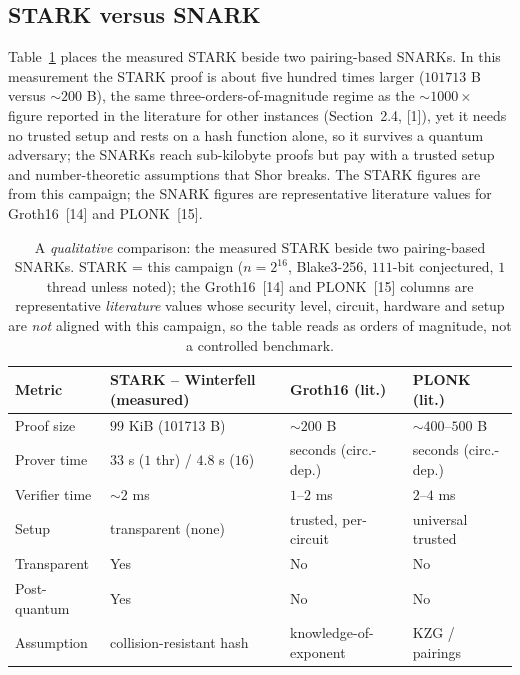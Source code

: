 \documentclass[11pt]{article}
\begin{document}
\subsection{STARK versus SNARK}
\label{sec:starkvssnark}

Table~\ref{tab:t5} places the measured STARK beside two pairing-based SNARKs. In this measurement the
STARK proof is about five hundred times larger ($\num{101713}$ B versus ${\sim}200$ B), the same
three-orders-of-magnitude regime as the ${\sim}1000\times$ figure reported in the literature for other
instances (Section~2.4, [1]), yet it needs no trusted setup and rests on a hash function alone, so
it survives a quantum adversary; the SNARKs reach sub-kilobyte proofs but pay with a trusted setup and
number-theoretic assumptions that Shor breaks. The STARK figures are from this campaign; the SNARK
figures are representative literature values for Groth16~[14] and PLONK~[15].

\begin{table}[htbp]\centering\footnotesize
\caption{A \emph{qualitative} comparison: the measured STARK beside two pairing-based SNARKs. STARK = this
campaign ($n=2^{16}$, Blake3-256, $111$-bit conjectured, $1$ thread unless noted); the Groth16~[14] and
PLONK~[15] columns are representative \emph{literature} values whose security level, circuit, hardware and
setup are \emph{not} aligned with this campaign, so the table reads as orders of magnitude, not a
controlled benchmark.}
\label{tab:t5}
\begin{tabular}{l l l l}
\toprule
Metric & STARK -- Winterfell (measured) & Groth16 (lit.) & PLONK (lit.) \\
\midrule
Proof size    & $99$ KiB (\num{101713} B)        & ${\sim}200$ B         & ${\sim}400$--$500$ B \\
Prover time   & $33$ s ($1$ thr) / $4.8$ s ($16$) & seconds (circ.-dep.) & seconds (circ.-dep.) \\
Verifier time & ${\sim}2$ ms                      & $1$--$2$ ms          & $2$--$4$ ms \\
Setup         & transparent (none)               & trusted, per-circuit & universal trusted \\
Transparent   & Yes                              & No                   & No \\
Post-quantum  & Yes                              & No                   & No \\
Assumption    & collision-resistant hash         & knowledge-of-exponent& KZG / pairings \\
\bottomrule
\end{tabular}
\end{table}
\end{document}
